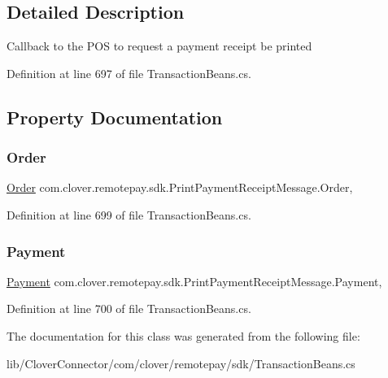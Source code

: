\subsection{Detailed Description}
Callback to the P\+OS to request a payment receipt be printed 



Definition at line 697 of file Transaction\+Beans.\+cs.



\subsection{Property Documentation}
\mbox{\label{classcom_1_1clover_1_1remotepay_1_1sdk_1_1_print_payment_receipt_message_ac8a030a3cf9e33eced012fe0664b1271}} 
\subsubsection{\texorpdfstring{Order}{Order}}
{\footnotesize\ttfamily \hyperlink{classcom_1_1clover_1_1sdk_1_1v3_1_1order_1_1_order}{Order} com.\+clover.\+remotepay.\+sdk.\+Print\+Payment\+Receipt\+Message.\+Order\hspace{0.3cm}{\ttfamily [get]}, {\ttfamily [set]}}



Definition at line 699 of file Transaction\+Beans.\+cs.

\mbox{\label{classcom_1_1clover_1_1remotepay_1_1sdk_1_1_print_payment_receipt_message_a199fbecfd435a443be49fa6c069f209a}} 
\subsubsection{\texorpdfstring{Payment}{Payment}}
{\footnotesize\ttfamily \hyperlink{classcom_1_1clover_1_1sdk_1_1v3_1_1payments_1_1_payment}{Payment} com.\+clover.\+remotepay.\+sdk.\+Print\+Payment\+Receipt\+Message.\+Payment\hspace{0.3cm}{\ttfamily [get]}, {\ttfamily [set]}}



Definition at line 700 of file Transaction\+Beans.\+cs.



The documentation for this class was generated from the following file\+:\begin{DoxyCompactItemize}
\item 
lib/\+Clover\+Connector/com/clover/remotepay/sdk/Transaction\+Beans.\+cs\end{DoxyCompactItemize}
